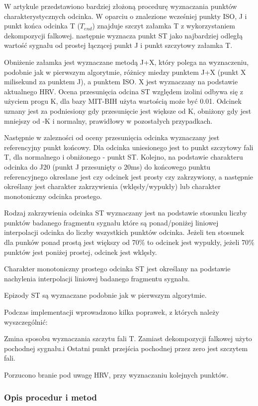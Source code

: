 \documentclass[a4paper, 11pt]{article}
\begin{document}
W artykule \cite{SHEN1} przedstawiono bardziej złożoną procedurę wyznaczania
punktów charakterystycznych odcinka. W oparciu o znalezione wcześniej punkty
ISO, J i punkt końca odcinka T ($T_{end}$) znajduje szczyt załamka T z
wykorzystaniem dekompozycji falkowej. następnie wyznacza punkt ST jako
najbardziej odległą wartość sygnału od prostej łączącej punkt J i punkt
szczytowy załamka T.

Obniżenie załamka jest wyznaczane metodą J+X, który polega na wyznaczeniu,
podobnie jak w pierwszym algorytmie, różnicy miedzy punktem J+X (punkt X
milisekund za punktem J), a punktem ISO. X jest wyznaczany na podstawie
aktualnego HRV. Ocena przesunięcia odcina ST względem izolini odbywa się z
użyciem progu K, dla bazy MIT-BIH użyta wartością może być 0.01. Odcinek uznany
jest za podniesiony gdy przesunięcie jest większe od K, obniżony gdy jest
mniejszy od -K i normalny, prawidłowy w pozostałych przypadkach.

Następnie w zalezności od oceny przesunięcia odcinka wyznaczany jest
referencyjny punkt końcowy. Dla odcinka uniesionego jest to punkt szczytowy
fali T, dla normalnego i obniżonego - punkt ST. Kolejno, na podstawie
charakteru odcinka do J20 (punkt J przesunięty o 20ms) do końcowego punktu
referencyjnego okreslane jest czy odcinek jest prosty czy zakrzywiony, a
następnie określany jest charakter zakrzywienia (wklęsły/wypukły) lub charakter
monotoniczny odcinka prostego.

Rodzaj zakrzywienia odcinka ST wyznaczany jest na podstawie stosunku liczby
punktów badanego fragmentu sygnału które są ponad/poniżej liniowej interpolacji
odcinka do liczby wszystkich punktów odcinka. Jeżeli ten stosunek dla punków
ponad prostą jest większy od 70\% to odcinek jest wypukły, jeżeli 70\% punktów
jest poniżej prostej, odcinek jest wklęsły.

Charakter monotoniczny prostego odcinka ST jest określany na podstawie
nachylenia interpolacji liniowej badanego fragmentu sygnału.

Epizody ST są wyznaczane podobnie jak w pierwszym algorytmie.

Podczas implementacji wprowadzono kilka poprawek, z których należy
wyszczególnić:

Zmina sposobu wyznaczania szczytu fali T. Zamiast dekompozycji falkowej użyto
pochodnej sygnału.i Ostatni punkt przejścia pochodnej przez zero jest szczytem
fali.

Porzucono branie pod uwagę HRV, przy wyznaczaniu kolejnych punktów.
\subsubsection{Opis procedur i metod}
\label{sec:st_interval:procs}
\end{document}
